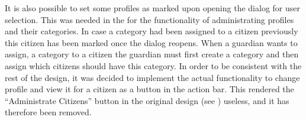 \FloatBarrier

It is also possible to set some profiles as marked upon opening the dialog for user selection. This was needed in the \ct for the functionality of administrating profiles and their categories. In case a category had been assigned to a citizen previously this citizen has been marked once the dialog reopens. When a guardian wants to assign, a category to a citizen the guardian must first create a category and then assign which citizens should have this category. In order to be consistent with the rest of the design, it was decided to implement the actual functionality to change profile and view it for a citizen as a button in the action bar. This rendered the ``Administrate Citizens'' button in the original design (see ) useless, and it has therefore been removed. 